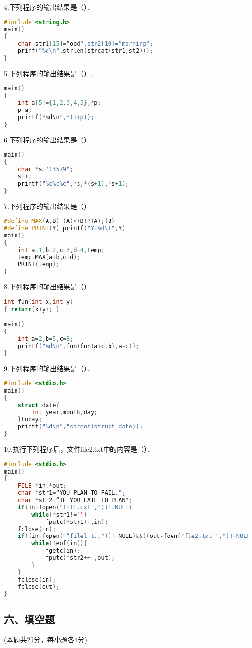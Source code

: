 4.下列程序的输出结果是（）．
\begin{lstlisting}[language=cpp]
#include <string.h>
main()
{
    char str1[15]=“ood",str2[10]=“morning";
    prinf("%d\n",strlen(strcat(str1,st2)));
}
\end{lstlisting}

5.下列程序的输出结果是（）.
\begin{lstlisting}[language=cpp]
main()
{
    int a[5]={1,2,3,4,5},*p;
    p=a;
    printf(*%d\n",*(++p));
}
\end{lstlisting}

6.下列程序的输出结果是（）．
\begin{lstlisting}[language=cpp]
main()
{
    char *s="13579";
    s++;
    printf("%c%c%c",*s,*(s+1),*s+1);
}
\end{lstlisting}

7.下列程序的输出结果是（）
\begin{lstlisting}[language=cpp]
#define MAX(A,B) (A)>(B)?(A);(B)
#define PRINT(Y) printf("Y=%d\t",Y)
main()
{
    int a=1,b=2,c=3,d=4,temp;
    temp=MAX(a+b,c+d);
    PRINT(temp);
}
\end{lstlisting}

8.下列程序的输出结果是（）
\begin{lstlisting}[language=cpp]
int fun(int x,int y)
{ return(x+y); }

main()
{
    int a=2,b=5,c=8;
    printf("%d\n",fun(fun(a+c,b),a-c));
}
\end{lstlisting}

9.下列程序的输出结果是（）．
\begin{lstlisting}[language=cpp]
#include <stdio.h>
main()
{
    struct date{
        int year,month,day;
    }today;
    printf("%d\n","sizeof(struct date));
}
\end{lstlisting}

10.执行下列程序后，文件file2.txt中的内容是（）．
\begin{lstlisting}[language=cpp]
#include <stdio.h>
main()
{
    FILE *in,*out;
    char *str1=“YOU PLAN TO FAIL.";
    char *str2=“IF YOU FAIL TO PLAN";
    if(in=fopen("filt.cxt","))!=NULL)
        while(*str1!='')
            fputc(*str1++,in);
    fclose(in);
    if((in=fopen("“filel t.,"))!=NULL)&&((out-foen("fle2.txt'",")!=NULL){
        while(!eof(in)){
            fgetc(in);
            fputc(*str2++ ,out);
        }
    }
    fclose(in);
    fclose(out);
}
\end{lstlisting}

\subsection{六、填空题}
(本题共20分，每小题各4分)

